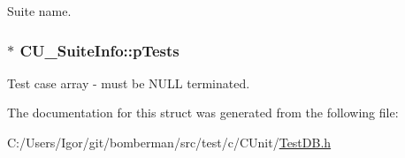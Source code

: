 Suite name. 

\hypertarget{struct_c_u___suite_info_a1fdb8ec9bbc72962dbbc95f156856463}{
\subsubsection[{p\+Tests}]{$\ast$ C\+U\+\_\+\+Suite\+Info\+::p\+Tests}}\label{struct_c_u___suite_info_a1fdb8ec9bbc72962dbbc95f156856463}


Test case array -\/ must be N\+U\+L\+L terminated. 



The documentation for this struct was generated from the following file\+:\begin{DoxyCompactItemize}
\item 
C\+:/\+Users/\+Igor/git/bomberman/src/test/c/\+C\+Unit/\hyperlink{_test_d_b_8h}{Test\+D\+B.\+h}\end{DoxyCompactItemize}
